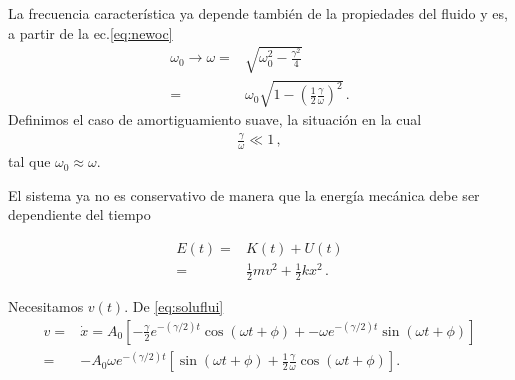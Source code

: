 La frecuencia característica ya depende también de la propiedades del fluido y es, a partir de  la ec.\eqref{eq:newoc}
\begin{align*}
  \omega_0\to \omega=&\sqrt{\omega_0^2-\frac{\gamma^2}{4}}\nonumber\\
=&\omega_0\sqrt{1-\left(\frac{1}{2}\frac{\gamma}{\omega}\right)^2}\,.
\end{align*}
Definimos el caso de amortiguamiento suave, la situación en la cual
\begin{align}
  \label{eq:SoftDamping}
  \frac{\gamma}{\omega}\ll 1\,,
\end{align}
tal que $\omega_0\approx\omega$. 


El sistema ya no es conservativo de manera que la energía mecánica debe ser dependiente del tiempo

\begin{align*}
  E(t)=&K(t)+U(t)\nonumber\\
=&\tfrac{1}{2}m v^2+\tfrac{1}{2}k x^2\,.
\end{align*}

Necesitamos $v(t)$. De \eqref{eq:soluflui}
\begin{align*}
  v=&\dot{x}=A_0 \left[-\frac{\gamma}{2}e^{-(\gamma/2)t}\cos(\omega t+\phi)+
            -\omega e^{-(\gamma/2)t}\sin(\omega t+\phi)\right]\nonumber\\
=&-A_0 \omega e^{-(\gamma/2)t} \left[\sin(\omega t+\phi)+\frac{1}{2}\frac{\gamma}{\omega}\cos(\omega t+\phi)\right].
\end{align*}

